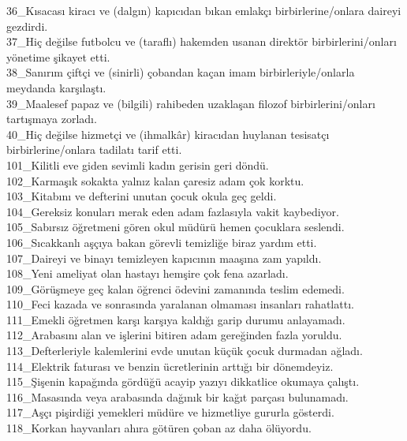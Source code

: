 \begin{myparindent}{0pt}
36\_Kısacası kiracı ve (dalgın) kapıcıdan bıkan emlakçı birbirlerine/onlara daireyi gezdirdi. \\
37\_Hiç değilse futbolcu ve (taraflı) hakemden usanan direktör birbirlerini/onları yönetime şikayet etti. \\
38\_Sanırım çiftçi ve (sinirli) çobandan kaçan imam birbirleriyle/onlarla meydanda karşılaştı. \\
39\_Maalesef papaz ve (bilgili) rahibeden uzaklaşan filozof birbirlerini/onları tartışmaya zorladı. \\
40\_Hiç değilse hizmetçi ve (ihmalkâr) kiracıdan huylanan tesisatçı birbirlerine/onlara tadilatı tarif etti. \\
101\_Kilitli eve giden sevimli kadın gerisin geri döndü. \\
102\_Karmaşık sokakta yalnız kalan çaresiz adam çok korktu. \\
103\_Kitabını ve defterini unutan çocuk okula geç geldi. \\
104\_Gereksiz konuları merak eden adam fazlasıyla vakit kaybediyor. \\
105\_Sabırsız öğretmeni gören okul müdürü hemen çocuklara seslendi. \\
106\_Sıcakkanlı aşçıya bakan görevli temizliğe biraz yardım etti. \\
107\_Daireyi ve binayı temizleyen kapıcının maaşına zam yapıldı. \\
108\_Yeni ameliyat olan hastayı hemşire çok fena azarladı. \\
109\_Görüşmeye geç kalan öğrenci ödevini zamanında teslim edemedi. \\
110\_Feci kazada ve sonrasında yaralanan olmaması insanları rahatlattı. \\
111\_Emekli öğretmen karşı karşıya kaldığı garip durumu anlayamadı. \\
112\_Arabasını alan ve işlerini bitiren adam gereğinden fazla yoruldu. \\
113\_Defterleriyle kalemlerini evde unutan küçük çocuk durmadan ağladı. \\
114\_Elektrik faturası ve benzin ücretlerinin arttığı bir dönemdeyiz. \\
115\_Şişenin kapağında gördüğü acayip yazıyı dikkatlice okumaya çalıştı. \\
116\_Masasında veya arabasında dağınık bir kağıt parçası bulunamadı. \\
117\_Aşçı pişirdiği yemekleri müdüre ve hizmetliye gururla gösterdi. \\
118\_Korkan hayvanları ahıra götüren çoban az daha ölüyordu. \\

\end{myparindent}
